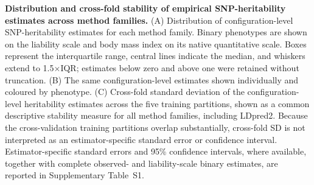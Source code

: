 \caption{\textbf{Distribution and cross-fold stability of empirical SNP-heritability estimates across method families.} (A) Distribution of configuration-level SNP-heritability estimates for each method family. Binary phenotypes are shown on the liability scale and body mass index on its native quantitative scale. Boxes represent the interquartile range, central lines indicate the median, and whiskers extend to 1.5$\times$IQR; estimates below zero and above one were retained without truncation. (B) The same configuration-level estimates shown individually and coloured by phenotype. (C) Cross-fold standard deviation of the configuration-level heritability estimates across the five training partitions, shown as a common descriptive stability measure for all method families, including LDpred2. Because the cross-validation training partitions overlap substantially, cross-fold SD is not interpreted as an estimator-specific standard error or confidence interval. Estimator-specific standard errors and 95\% confidence intervals, where available, together with complete observed- and liability-scale binary estimates, are reported in Supplementary Table~S1.}
